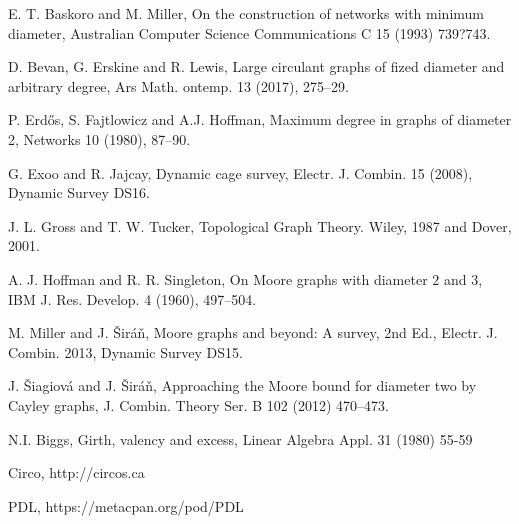 \documentclass[a4paper,12pt,oneside]{report}%
\begin{document}
\begin{thebibliography}{xx}

 E. T. Baskoro and M. Miller, On the construction of networks with minimum diameter,
Australian Computer Science Communications C 15 (1993) 739?743.

 D. Bevan, G. Erskine and R. Lewis, Large circulant graphs of fized diameter and arbitrary degree, Ars Math. ontemp. 13 (2017), 275--29.

 P. Erd{\H o}s, S. Fajtlowicz and A.J. Hoffman,
Maximum degree in graphs of diameter 2, Networks 10
(1980), 87--90.

 G. Exoo and R. Jajcay, Dynamic cage survey, Electr. J. Combin. 15 (2008), Dynamic Survey DS16.

 J. L. Gross and T. W. Tucker, Topological Graph Theory. Wiley, 1987 and Dover, 2001.

 A. J. Hoffman and R. R. Singleton, On Moore graphs with diameter $2$ and $3$, IBM J. Res. Develop. 4 (1960), 497--504.

 M. Miller and J. \v{S}ir\'a\v{n},  Moore graphs and beyond: A survey, 2nd Ed., Electr. J. Combin. 2013, Dynamic Survey DS15.

 J. \v{S}iagiov\'a and J. \v{S}ir\'a\v{n}, Approaching the Moore bound for diameter two by Cayley graphs, J. Combin. Theory Ser. B 102 (2012) 470--473.

 N.I. Biggs, Girth, valency and excess, Linear Algebra Appl. 31 (1980) 55-59

 Circo, http://circos.ca

 PDL, https://metacpan.org/pod/PDL

\end{thebibliography}
\end{document}
